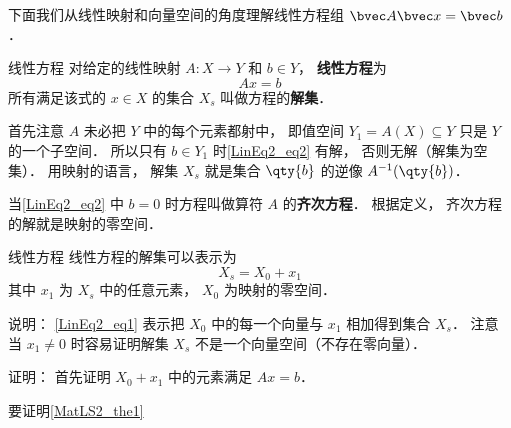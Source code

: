 

下面我们从线性映射和向量空间的角度理解线性方程组 $\bvec A \bvec x = \bvec b$．


\begin{definition}{线性方程}
对给定的线性映射 $A:X\to Y$ 和 $b \in Y$， \textbf{线性方程}为
\begin{equation}\label{LinEq2_eq2}
Ax = b
\end{equation}
所有满足该式的 $x \in X$ 的集合 $X_s$ 叫做方程的\textbf{解集}．
\end{definition}

首先注意 $A$ 未必把 $Y$ 中的每个元素都射中， 即值空间 $Y_1 = A(X) \subseteq Y$ 只是 $Y$ 的一个子空间． 所以只有 $b \in Y_1$ 时\autoref{LinEq2_eq2} 有解， 否则无解（解集为空集）． 用映射的语言， 解集 $X_s$ 就是集合 $\qty{b}$ 的逆像 $A^{-1}(\qty{b})$．

当\autoref{LinEq2_eq2} 中 $b = 0$ 时方程叫做算符 $A$ 的\textbf{齐次方程}． 根据定义， 齐次方程的解就是映射的零空间．

\begin{theorem}{线性方程}
线性方程的解集可以表示为
\begin{equation}\label{LinEq2_eq1}
X_s = X_0 + x_1
\end{equation}
其中 $x_1$ 为 $X_s$ 中的任意元素，  $X_0$ 为映射的零空间．
\end{theorem}
说明： \autoref{LinEq2_eq1} 表示把 $X_0$ 中的每一个向量与 $x_1$ 相加得到集合 $X_s$． 注意当 $x_1 \ne 0$ 时容易证明解集 $X_s$ 不是一个向量空间（不存在零向量）．

证明： 首先证明 $X_0 + x_1$ 中的元素满足 $Ax = b$．

要证明\autoref{MatLS2_the1}~
